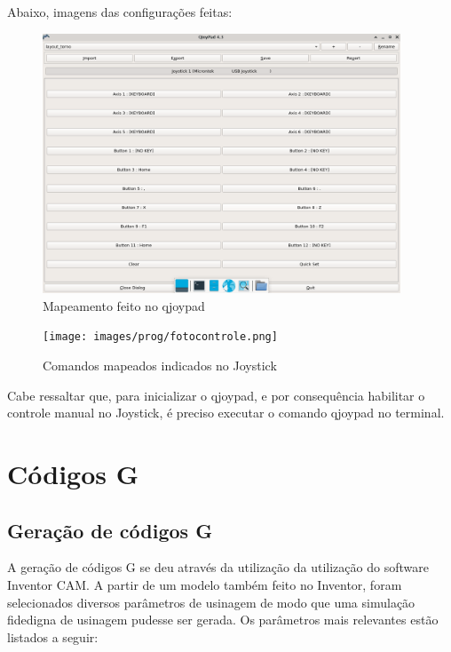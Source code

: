 Abaixo, imagens das configurações feitas:

\begin{figure}[H]
    \begin{center}
        \includegraphics[width=0.95\textwidth]{images/prog/qjoypad_config.png}
    \end{center}
    \caption{Mapeamento feito no qjoypad}\label{qjoypad}
\end{figure}


\begin{figure}[H]
    \begin{center}
        \texttt{[image: images/prog/fotocontrole.png]}
    \end{center}
    \caption{Comandos mapeados indicados no Joystick}\label{controle_joy}
\end{figure}

Cabe ressaltar que, para inicializar o qjoypad, e por consequência habilitar o controle manual no Joystick, é preciso executar o comando qjoypad no terminal. 

\section{Códigos G}
\subsection{Geração de códigos G}

A geração de códigos G se deu através da utilização da utilização do software Inventor CAM. A partir de um modelo também feito no Inventor, foram selecionados diversos parâmetros de usinagem de modo que uma simulação fidedigna de usinagem pudesse ser gerada. Os parâmetros mais relevantes estão listados a seguir: 

